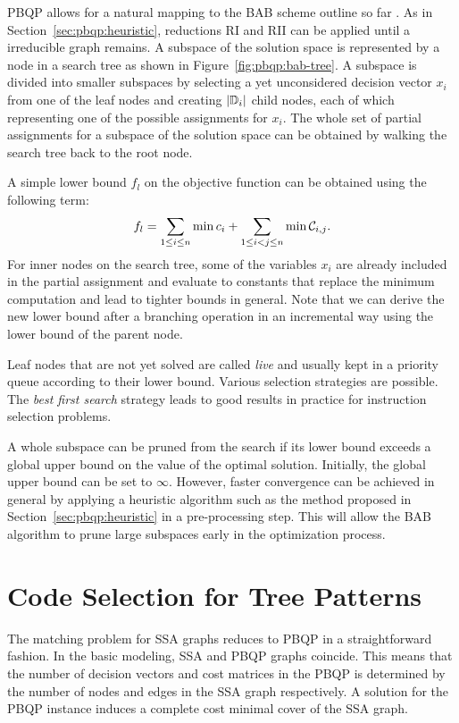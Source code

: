 PBQP allows for a natural mapping to the BAB scheme outline so far
\cite{DBLP:conf/jmlc/HamesS06}. As in
Section~\ref{sec:pbqp:heuristic}, reductions RI and RII can be applied
until a irreducible graph remains. A subspace of the solution space is
represented by a node in a search tree as shown in
Figure~\ref{fig:pbqp:bab-tree}. A subspace is divided into smaller
subspaces by selecting a yet unconsidered decision vector $x_i$ from
one of the leaf nodes and creating $|\mathbb D_i|$ child nodes, each
of which representing one of the possible assignments for $x_i$. The
whole set of partial assignments for a subspace of the solution space
can be obtained by walking the search tree back to the root node.

A simple lower bound $f_l$ on the objective function can be obtained
using the following term:
$$f_l = \sum_{1 \leq i \leq n} \min c_i + \sum_{1 \leq i < j  \leq n}
\min {\mathcal C}_{i,j}.$$ For inner nodes on the search tree, some
of the variables $x_i$ are already included in the partial assignment
and evaluate to constants that replace the minimum computation and
lead to tighter bounds in general. Note that we can derive the new
lower bound after a branching operation in an incremental way using
the lower bound of the parent node.

Leaf nodes that are not yet solved are called \emph{live} and usually
kept in a priority queue according to their lower
bound. Various selection strategies are possible. The
\emph{best first search} strategy leads to good results in practice
for instruction selection problems.

A whole subspace can be pruned from the search if its lower bound
exceeds a global upper bound on the value of the optimal
solution. Initially, the global upper bound can be set to
$\infty$. However, faster convergence can be achieved in general by
applying a heuristic algorithm such as the method proposed in
Section~\ref{sec:pbqp:heuristic} in a pre-processing step. This will
allow the BAB algorithm to prune large subspaces early in the
optimization process.

\section{Code Selection for Tree Patterns}
The matching problem for SSA graphs reduces to PBQP
\cite{EcksteinKS03} in a straightforward fashion. In the basic
modeling, SSA and PBQP graphs coincide. This means that the number of
decision vectors and cost matrices in the PBQP is determined by the
number of nodes and edges in the SSA graph respectively. A solution
for the PBQP instance induces a complete cost minimal cover of the SSA
graph.

